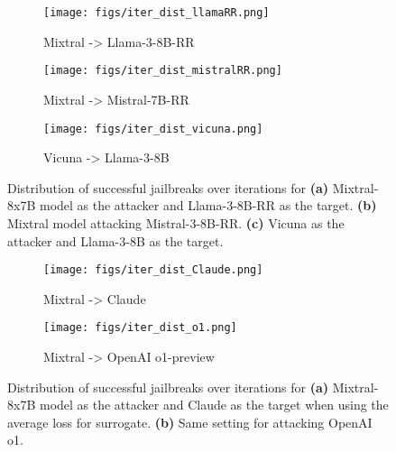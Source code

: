 \begin{figure}[h!]
     \centering
     \begin{subfigure}[b]{0.33\textwidth}
         \centering
         \texttt{[image: figs/iter\_dist\_llamaRR.png]}
         \caption{Mixtral -> Llama-3-8B-RR}
         \label{dist_llamaRR}
     \end{subfigure}
     \begin{subfigure}[b]{0.33\textwidth}
         \centering
         \texttt{[image: figs/iter\_dist\_mistralRR.png]}
         \caption{Mixtral -> Mistral-7B-RR}
         \label{dist_mistralRR}
     \end{subfigure}
     \begin{subfigure}[b]{0.33\textwidth}
         \centering
         \texttt{[image: figs/iter\_dist\_vicuna.png]}
         \caption{Vicuna -> Llama-3-8B}
         \label{dist_vicuna}
     \end{subfigure}
        \caption{Distribution of successful jailbreaks over iterations for \textbf{(a)} Mixtral-8x7B model as the attacker and Llama-3-8B-RR as the target. \textbf{(b)} Mixtral model attacking Mistral-3-8B-RR.  \textbf{(c)} Vicuna as the attacker and Llama-3-8B as the target.}
        \label{dists_white}
\end{figure}


\begin{figure}[h!]
     \centering
     \begin{subfigure}[b]{0.33\textwidth}
         \centering
         \texttt{[image: figs/iter\_dist\_Claude.png]}
         \caption{Mixtral -> Claude}
         \label{dist_Claude}
     \end{subfigure}
    \hspace{0.6in}
     \begin{subfigure}[b]{0.33\textwidth}
         \centering
         \texttt{[image: figs/iter\_dist\_o1.png]}
         \caption{Mixtral -> OpenAI o1-preview}
         \label{dist_o1}
     \end{subfigure}
        \caption{Distribution of successful jailbreaks over iterations for \textbf{(a)} Mixtral-8x7B model as the attacker and Claude as the target when using the average loss  for surrogate.  \textbf{(b)} Same setting for attacking OpenAI o1.} 
        \label{dists_black}
\end{figure}


